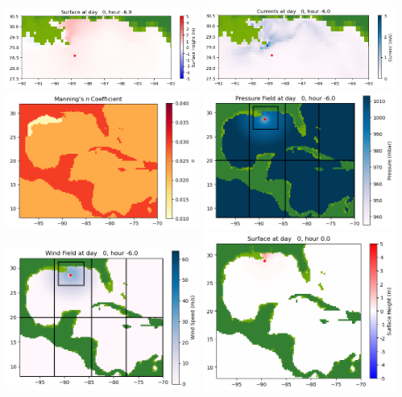 \documentclass[11pt]{article}
\begin{document}
\vskip 10pt 
\includegraphics[width=0.475\textwidth]{frame0007fig1003.png}
\includegraphics[width=0.475\textwidth]{frame0007fig1004.png}
\vskip 10pt 
\includegraphics[width=0.475\textwidth]{frame0007fig1005.png}
\includegraphics[width=0.475\textwidth]{frame0007fig1006.png}
\vskip 10pt 
\includegraphics[width=0.475\textwidth]{frame0007fig1007.png}
\vskip 10pt 
\includegraphics[width=0.475\textwidth]{frame0008fig1001.png}
\end{document}
